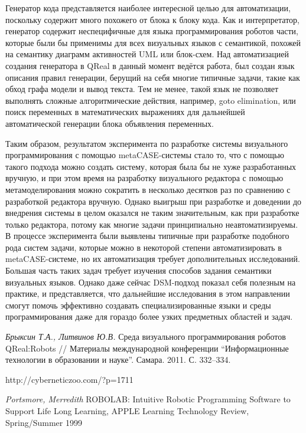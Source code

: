 \documentclass[a4paper]{article}
\begin{document}
Генератор кода представляется наиболее интересной целью для автоматизации, поскольку содержит много похожего от блока к блоку кода. Как и интерпретатор, генератор содержит неспецифичные для языка программирования роботов части, которые были бы применимы для всех визуальных языков с семантикой, похожей на семантику диаграмм активностей UML или блок-схем. Над автоматизацией создания генератора в QReal в данный момент ведётся работа, был создан язык описания правил генерации, берущий на себя многие типичные задачи, такие как обход графа модели и вывод текста. Тем не менее, такой язык не позволяет выполнять сложные алгоритмические действия, например, goto elimination, или поиск переменных в математических выражениях для дальнейшей автоматической генерации блока объявления переменных.

Таким образом, результатом эксперимента по разработке системы визуального программирования с помощью metaCASE-системы стало то, что с помощью такого подхода можно создать систему, которая была бы не хуже разработанных вручную, и при этом время на разработку визуального редактора с помощью метамоделирования можно сократить в несколько десятков раз по сравнению с разработкой редактора вручную. Однако выигрыш при разработке и доведении до внедрения системы в целом оказался не таким значительным, как при разработке только редактора, потому как многие задачи принципиально неавтоматизируемы. В процессе эксперимента были выявлены типичные при разработке подобного рода систем задачи, которые можно в некоторой степени автоматизировать в metaCASE-системе, но их автоматизация требует дополнительных исследований. Большая часть таких задач требует изучения способов задания семантики визуальных языков. Однако даже сейчас DSM-подход показал себя полезным на практике, и представляется, что дальнейшие исследования в этом направлении смогут помочь эффективно создавать специализированные языки и среды программирования даже для гораздо более узких предметных областей и задач.

\begin{thebibliography}{9001}

   \emph{Брыксин Т.А., Литвинов Ю.В.} Среда визуального программирования роботов QReal:Robots // Материалы международной конференции ``Информационные технологии в образовании и науке''. Самара. 2011. С. 332--334.
  
   http://cyberneticzoo.com/?p=1711
  
   \emph{Portsmore, Merredith} ROBOLAB: Intuitive Robotic Programming Software to Support Life Long Learning, APPLE Learning Technology Review, Spring/Summer 1999

\end{thebibliography}
\end{document}
